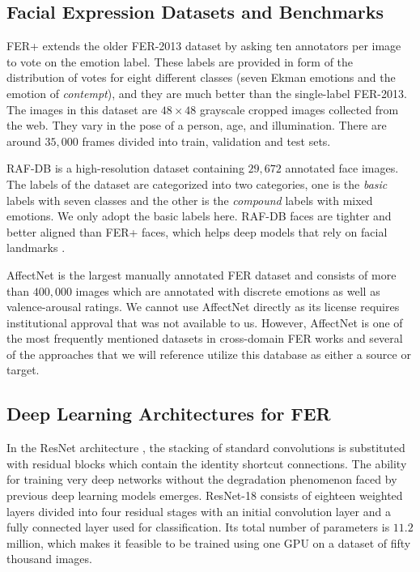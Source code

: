 \documentclass[12pt,a4paper]{article}
\begin{document}
\subsection{Facial Expression Datasets and Benchmarks}
\label{sec:litrev:datasets}

FER+ \autocite{barsoum2016ferplus} extends the older FER-2013
dataset by asking ten annotators per image to vote on the
emotion label.  These labels are provided in form of the distribution of votes
for eight different classes (seven Ekman emotions and the emotion of
\emph{contempt}), and they are much better than the single-label FER-2013. The images in
this dataset are $48\times 48$ grayscale cropped images collected from the web. They vary
in the pose of a person, age, and illumination. There are around $35{,}000$ frames
divided into train, validation and test sets.

RAF-DB \autocite{li2019rafdb} is a high-resolution dataset
containing $29{,}672$ annotated face images.
The labels of the dataset are categorized into two categories,
one is the \emph{basic} labels with seven classes
and the other is the \emph{compound} labels with mixed emotions.
We only adopt the basic labels here.  RAF-DB
faces are tighter and better aligned than FER+ faces, which
helps deep models that rely on facial landmarks
\autocite{wang2020ran}.

AffectNet \autocite{mollahosseini2017affectnet} is the largest manually
annotated FER dataset and consists of more than $400{,}000$ images which
are annotated with discrete emotions as well as valence-arousal
ratings. We cannot use AffectNet directly as its license
requires institutional approval that was not available to us.
However, AffectNet is one of the most frequently mentioned datasets
in cross-domain FER works and several of the approaches that we will
reference utilize this database as either a source or target.

\subsection{Deep Learning Architectures for FER}
\label{sec:litrev:arch}

In the ResNet architecture \autocite{he2016resnet}, the stacking
of standard convolutions is substituted with residual blocks which
contain the identity shortcut connections. The ability for training
very deep networks without the degradation phenomenon faced by
previous deep learning models emerges. ResNet-18 consists of
eighteen weighted layers divided into four residual stages with
an initial convolution layer and a fully connected layer used for
classification. Its total number of parameters is $11.2$
million, which makes it feasible to be trained using one GPU on
a dataset of fifty thousand images.
\end{document}
